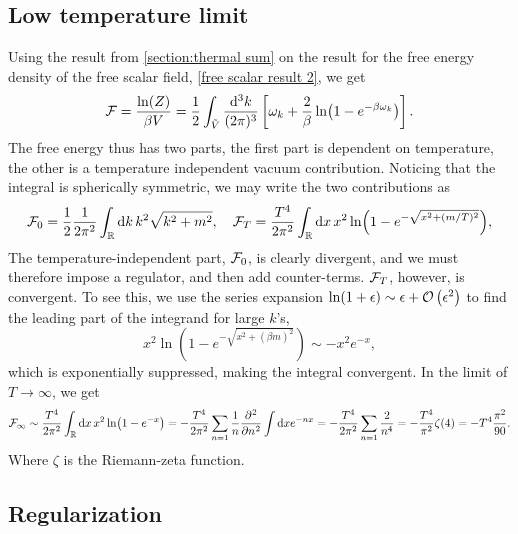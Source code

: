 \subsection*{Low temperature limit}

Using the result from \autoref{section:thermal sum} on the result for the free energy density of the free scalar field, \autoref{free scalar result 2}, we get
\begin{equation}
    \label{free scalar free enrgy}
    \mathcal{F} = \frac{\ln(Z)}{\beta V}
    = \frac{1}{2} \int_{\tilde V} \frac{\dd^3 k}{(2 \pi)^3}
    \left[
        \omega_k + \frac{2}{\beta }\ln(1 - e^{-\beta\omega_k})
    \right].
\end{equation}
The free energy thus has two parts, the first part is dependent on temperature, the other is a temperature independent vacuum contribution.
Noticing that the integral is spherically symmetric, we may write the two contributions as
\begin{equation}
    \mathcal{F}_0 = \frac{1}{2} \frac{1}{2 \pi^2}\int_{\mathbb{R}} \dd k \, k^2 \sqrt{k^2 + m^2}, \quad
    \mathcal{F}_T = \frac{T^4}{2 \pi^2}\int_{\mathbb{R}} \dd x \, x^2  \ln(1 - e^{-\sqrt{x^2 + (m/T)^2}}), 
\end{equation}
The temperature-independent part, $\mathcal{F}_0$, is clearly divergent, and we must therefore impose a regulator, and then add counter-terms.
$\mathcal{F}_T$, however, is convergent. 
To see this, we use the series expansion $\ln(1 + \epsilon) \sim \epsilon + \mathcal{O}\left(\epsilon^{2}\right)$ to find the leading part of the integrand for large $k$'s, 
\begin{equation}
    x^2 \ln(1 - e^{-\sqrt{x^2 + (\beta m)^2}}) \sim - x^2 e^{-x}, 
\end{equation}
which is exponentially suppressed, making the integral convergent.
In the limit of $T \rightarrow \infty$, we get
\begin{equation}
    \Ef_\infty \sim \frac{T^4}{2 \pi^2} \int_\R \dd x \, x^2 \ln(1 - e^{-x})
    = - \frac{T^4}{2 \pi^2} \sum_{n=1} \frac{1}{n} \diffp[2]{}{n} \int \dd x e^{-nx}
    = - \frac{T^4}{2 \pi^2} \sum_{n=1} \frac{2}{n^4}
    = - \frac{T^4}{\pi^2} \zeta(4)
    = - T^4 \frac{\pi^2}{90}.
\end{equation}
Where $\zeta$ is the Riemann-zeta function.

\subsection*{Regularization}
\label{section: regualting free energy}


